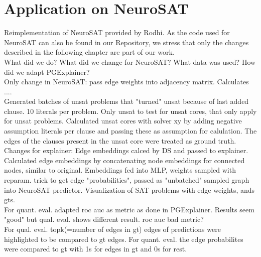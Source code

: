 \section{Application on NeuroSAT}
Reimplementation of NeuroSAT provided by Rodhi. As the code used for NeuroSAT can also be found in our Repository, we stress that only the changes described in the following chapter are part of our work. \\

What did we do? What did we change for NeuroSAT? What data was used? How did we adapt PGExplainer? \\

Only change in NeuroSAT: pass edge weights into adjacency matrix. Calculates .... \\
Generated batches of unsat problems that "turned" unsat because of last added clause. 10 literals per problem. Only unsat to test for unsat cores, that only apply for unsat problems. Calculated unsat cores with solver xy by adding negative assumption literals per clause and passing these as assumption for calulation. The edges of the clauses present in the unsat core were treated as ground truth. \\

Changes for explainer:
Edge embeddings calced by DS and passed to explainer. Calculated edge embeddings by concatenating node embeddings for connected nodes, similar to original. Embeddings fed into MLP, weights sampled with reparam. trick to get edge "probabilities", passed as "unbatched" sampled graph into NeuroSAT predictor. Visualization of SAT problems with edge weights, ands gts. \\
For quant. eval. adapted roc auc as metric as done in PGExplainer. Results seem "good" but qual. eval. shows different result. roc auc bad metric? \\
For qual. eval. topk(=number of edges in gt) edges of predictions were highlighted to be compared to gt edges. For quant. eval. the edge probabilites were compared to gt with 1s for edges in gt and 0s for rest. \\